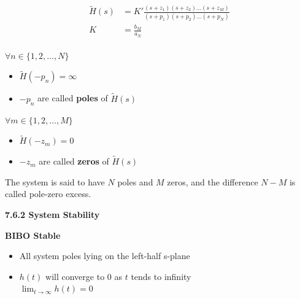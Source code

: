 \documentclass[landscape,a4paper]{extarticle}
\newenvironment{Figure}
  {\noindent\minipage{\linewidth}}
  {\endminipage\par\medskip}
\begin{document}
\begin{multicols*}{5}
    \begin{align*}
        \begin{split}
            \tilde{H}(s) &= K'\frac{(s+z_1)(s+z_2)\ldots (s+z_M)}{(s+p_1)(s+p_2)\ldots (s+p_N)} \\
            K &=  \frac{b_M}{a_N}
        \end{split} \tag{7.23c}
    \end{align*}

    $\forall n \in \{1,2, \ldots , N\}$ 
    \begin{itemize}
        \item $\tilde{H}(-p_n) = \infty$
        \item $-p_n$ are called \textbf{poles} of $\tilde{H}(s)$
    \end{itemize}
    $\forall m \in \{1,2, \ldots , M\}$ 
    \begin{itemize}
        \item $\tilde{H}(-z_m) = 0$
        \item $-z_m$ are called \textbf{zeros} of $\tilde{H}(s)$
    \end{itemize}

    The system is said to have $N$ poles and $M$ zeros, and the difference $N-M$ is called pole-zero excess.

    \textbf{7.6.2 System Stability}

    \textbf{BIBO Stable}
    \begin{itemize}
        \item All system poles lying on the left-half s-plane
        \item $h(t)$ will converge to 0 as $t$ tends to infinity\\
        $\lim_{t \to \infty} h(t) = 0$
    \end{itemize}






\end{multicols*}
\end{document}
